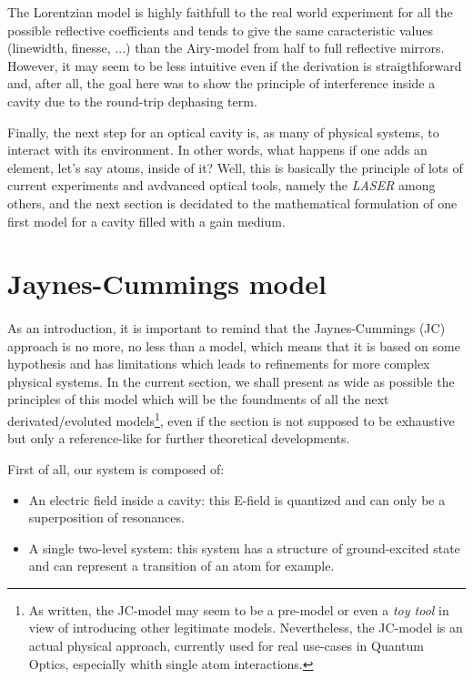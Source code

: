\documentclass[12pt]{report}
\begin{document}
The Lorentzian model is highly faithfull to the real world experiment for all the possible reflective coefficients and tends to give the same caracteristic values (linewidth, finesse, ...) than the Airy-model from half to full reflective mirrors. However, it may seem to be less intuitive even if the derivation is straigthforward and, after all, the goal here was to show the principle of interference inside a cavity due to the round-trip dephasing term.

Finally, the next step for an optical cavity is, as many of physical systems, to interact with its environment. In other words, what happens if one adds an element, let's say atoms, inside of it? Well, this is basically the principle of lots of current experiments and avdvanced optical tools, namely the \textit{LASER} among others, and the next section is decidated to the mathematical formulation of one first model for a cavity filled with a gain medium.

\section{Jaynes-Cummings model}
\paragraph{}
As an introduction, it is important to remind that the Jaynes-Cummings (JC) approach is no more, no less than a model, which means that it is based on some hypothesis and has limitations which leads to refinements for more complex physical systems. In the current section, we shall present as wide as possible the principles of this model which will be the foundments of all the next derivated/evoluted models\footnote{As written, the JC-model may seem to be a pre-model or even a \textit{toy tool} in view of introducing other legitimate models. Nevertheless, the JC-model is an actual physical approach, currently used for real use-cases in Quantum Optics, especially whith single atom interactions.}, even if the section is not supposed to be exhaustive but only a reference-like for further theoretical developments.

First of all, our system is composed of:
\begin{itemize}
	\item An electric field inside a cavity: this E-field is quantized and can only be a superposition of resonances.
	\item A single two-level system: this system has a structure of ground-excited state and can represent a transition of an atom for example.
\end{itemize}
\end{document}

